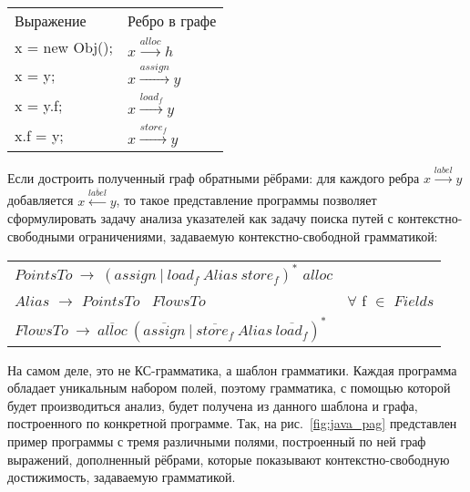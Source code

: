\begin{table}[H]
    \centering
    \begin{tabular}{ll}
        Выражение & Ребро в графе \\
        x = new Obj(); & $x \xrightarrow{alloc} h$ \\
        x = y; & $x \xrightarrow{assign} y$ \\
        x = y.f; & $x \xrightarrow{load_f} y$ \\
        x.f = y; & $x \xrightarrow{store_f} y$ \\
    \end{tabular}
\end{table}

Если достроить полученный граф обратными рёбрами: для каждого ребра $x \xrightarrow{label} y$ добавляется $x \xleftarrow{\overline{label}} y$, то такое представление программы позволяет сформулировать задачу анализа указателей как задачу поиска путей с контекстно-свободными ограничениями, задаваемую контекстно-свободной грамматикой:

\begin{table}[h]
    \centering
    \begin{tabular}{ll}
        $PointsTo\ \to\ (assign\ |\ load_f\ Alias\ store_f)^*$ $alloc$ & \\
        $Alias$ $\to$ $PointsTo$ \ $FlowsTo$ & $\forall$ f $\in$ $Fields$ \\
        $FlowsTo\ \to\ \overline{alloc}\ (\overline{assign}\ |\ \overline{store_f}\ Alias\ \overline{load_f})^*$ & \\
    \end{tabular}
\end{table}

На самом деле, это не КС-грамматика, а шаблон грамматики. Каждая программа обладает уникальным набором полей, поэтому грамматика, с помощью которой будет производиться анализ, будет получена из данного шаблона и графа, построенного по конкретной программе. Так, на рис.~\ref{fig:java_pag} представлен пример программы с тремя различными полями, построенный по ней граф выражений, дополненный рёбрами, которые показывают контекстно-свободную достижимость, задаваемую грамматикой.

